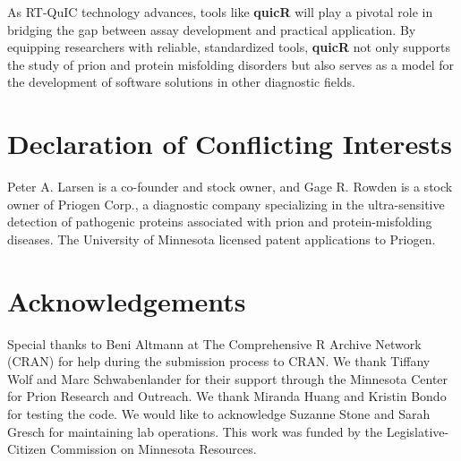 \documentclass[preprint,12pt,a4paper]{elsarticle}
\begin{document}
As RT-QuIC technology advances, tools like \textbf{quicR} will play a pivotal role in bridging the gap between assay development and practical application. By equipping researchers with reliable, standardized tools, \textbf{quicR} not only supports the study of prion and protein misfolding disorders but also serves as a model for the development of software solutions in other diagnostic fields.

    \section*{Declaration of Conflicting Interests}
        Peter A. Larsen is a co-founder and stock owner, and Gage R. Rowden is a stock owner of Priogen Corp., a diagnostic company specializing in the ultra-sensitive detection of pathogenic proteins associated with prion and protein-misfolding diseases. The University of Minnesota licensed patent applications to Priogen.

\section*{Acknowledgements}
Special thanks to Beni Altmann at The Comprehensive R Archive Network (CRAN) for help during the submission process to CRAN. We thank Tiffany Wolf and Marc Schwabenlander for their support through the Minnesota Center for Prion Research and Outreach. We thank Miranda Huang and Kristin Bondo for testing the code. We would like to acknowledge Suzanne Stone and Sarah Gresch for maintaining lab operations. This work was funded by the Legislative-Citizen Commission on Minnesota Resources.


 

\end{document}
